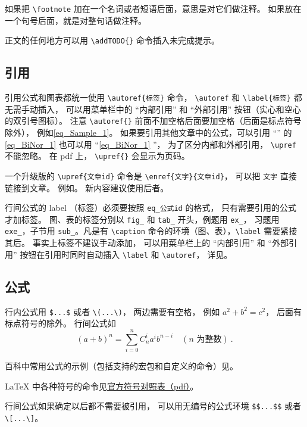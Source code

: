 如果把 \verb|\footnote| 加在一个名词或者短语后面，意思是对它们做注释。 如果放在一个句号后面，就是对整句话做注释。

正文的任何地方可以用 \verb|\addTODO{}| 命令插入未完成提示。

\subsection{引用}
引用公式和图表都统一使用 \verb|\autoref{标签}| 命令， \verb|\autoref| 和 \verb|\label{标签}| 都无需手动插入， 可以用菜单栏中的 “内部引用” 和 “外部引用” 按钮（实心和空心的双引号图标）。 注意 \verb|\autoref{}| 前面不加空格后面要加空格（后面是标点符号除外）， 例如\autoref{eq_Sample_1}。 如果要引用其他文章中的公式，可以引用 “” 的\autoref{eq_BiNor_1} 也可以用 “\autoref{eq_BiNor_1} ”， 为了区分内部和外部引用， \verb|\upref| 不能忽略。 在 pdf 上， \verb|\upref{}| 会显示为页码。

一个升级版的 \verb`\upref{文章id}` 命令是 \verb`\enref{文字}{文章id}`， 可以把 \verb`文字` 直接链接到文章。 例如。 新内容建议使用后者。

行间公式的 label （标签）必须要按照 \verb|eq_公式id| 的格式， 只有需要引用的公式才加标签。 图、表的标签分别以 \verb|fig_| 和 \verb|tab_| 开头，例题用 \verb|ex_|， 习题用 \verb|exe_|，子节用 \verb`sub_`。凡是有 \verb|\caption| 命令的环境（图、表），\verb|\label| 需要紧接其后。 事实上标签不建议手动添加， 可以用菜单栏上的 “内部引用” 和 “外部引用” 按钮在引用时同时自动插入 \verb|\label| 和 \verb|\autoref|， 详见。

\subsection{公式}
行内公式用 \verb|$...$| 或者 \verb|\(...\)|， 两边需要有空格， 例如 $a^2+b^2=c^2$， 后面有标点符号的除外。 行间公式如
\begin{equation}\label{eq_Sample_1}
(a+b)^n = \sum_{i=0}^n C_n^i a^i b^{n-i} \quad (\text{$n$ 为整数})~.
\end{equation}

百科中常用公式的示例（包括支持的宏包和自定义的命令）见。

LaTeX 中各种符号的命令见\href{https://tug.ctan.org/info/symbols/comprehensive/symbols-a4.pdf}{官方符号对照表（pdf）}。

行间公式如果确定以后都不需要被引用， 可以用无编号的公式环境 \verb|$$...$$| 或者 \verb|\[...\]|。


